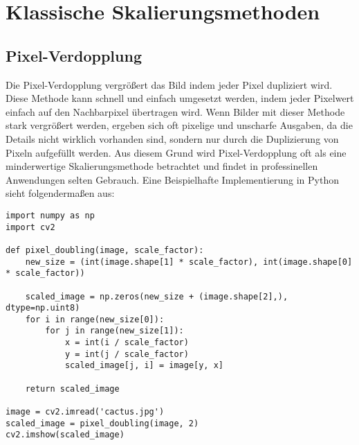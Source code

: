 
\chapter{Klassische Skalierungsmethoden}

\section{Pixel-Verdopplung}
Die Pixel-Verdopplung vergrößert das Bild indem jeder Pixel dupliziert wird.
Diese Methode kann schnell und einfach umgesetzt werden, indem jeder Pixelwert einfach auf den Nachbarpixel übertragen wird. 
Wenn Bilder mit dieser Methode stark vergrößert werden, ergeben sich oft pixelige und unscharfe Ausgaben, da die Details nicht wirklich vorhanden sind, sondern nur durch die Duplizierung von Pixeln aufgefüllt werden. 
Aus diesem Grund wird Pixel-Verdopplung oft als eine minderwertige Skalierungsmethode betrachtet und findet in professinellen Anwendungen selten Gebrauch.
\newpage
Eine Beispielhafte Implementierung in Python sieht folgendermaßen aus: 
\begin{lstlisting}
import numpy as np
import cv2

def pixel_doubling(image, scale_factor):
    new_size = (int(image.shape[1] * scale_factor), int(image.shape[0] * scale_factor))
    
    scaled_image = np.zeros(new_size + (image.shape[2],), dtype=np.uint8)
    for i in range(new_size[0]):
        for j in range(new_size[1]):
            x = int(i / scale_factor)
            y = int(j / scale_factor)
            scaled_image[j, i] = image[y, x]
    
    return scaled_image

image = cv2.imread('cactus.jpg')
scaled_image = pixel_doubling(image, 2)
cv2.imshow(scaled_image)
\end{lstlisting}
